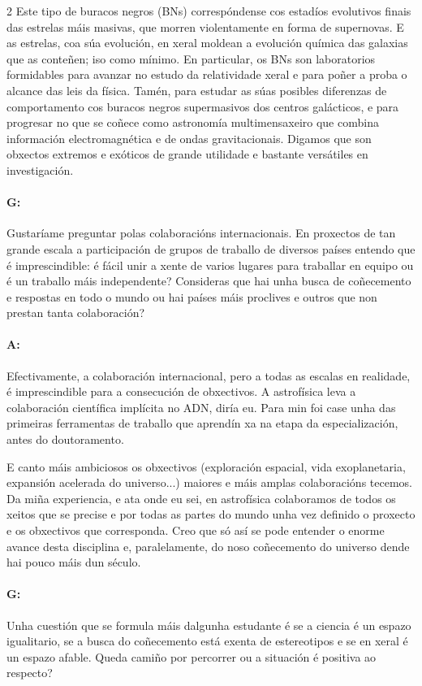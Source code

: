 \begin{multicols}{2}
Este tipo de buracos negros (BNs) correspóndense cos estadíos evolutivos finais
das estrelas máis masivas, que morren violentamente en forma de supernovas. E
as estrelas, coa súa evolución, en xeral moldean a evolución química das
galaxias que as conteñen; iso como mínimo. En particular, os BNs son
laboratorios formidables para avanzar no estudo da relatividade xeral e para
poñer a proba o alcance das leis da física. Tamén, para estudar as súas
posibles diferenzas de comportamento cos buracos negros supermasivos dos
centros galácticos, e para progresar no que se coñece como astronomía
multimensaxeiro que combina información electromagnética e de ondas
gravitacionais. Digamos que son obxectos extremos e exóticos de grande
utilidade e bastante versátiles en investigación.

\paragraph{G:} Gustaríame preguntar polas colaboracións internacionais. En
proxectos de tan grande escala a participación de grupos de traballo de
diversos países entendo que é imprescindible: é fácil unir a xente de varios
lugares para traballar en equipo ou é un traballo máis independente? Consideras
que hai unha busca de coñecemento e respostas en todo o mundo ou hai países
máis proclives e outros que non prestan tanta colaboración?

\paragraph{A:} Efectivamente, a colaboración internacional, pero a todas as
escalas en realidade, é imprescindible para a consecución de obxectivos. A
astrofísica leva a colaboración científica implícita no ADN, diría eu. Para min
foi case unha das primeiras ferramentas de traballo que aprendín xa na etapa da
especialización, antes do doutoramento.

E canto máis ambiciosos os obxectivos (exploración espacial, vida
exoplanetaria, expansión acelerada do universo...) maiores e máis amplas
colaboracións tecemos. Da miña experiencia, e ata onde eu sei, en
astrofísica colaboramos de todos os xeitos que se precise e por todas as partes
do mundo unha vez definido o proxecto e os obxectivos que corresponda. Creo
que só así se pode entender o enorme avance desta disciplina e, paralelamente,
do noso coñecemento do universo dende hai pouco máis dun século.

\paragraph{G:} Unha cuestión que se formula máis dalgunha estudante é se a
ciencia é un espazo igualitario, se a busca do coñecemento está exenta de
estereotipos e se en xeral é un espazo afable. Queda camiño por percorrer ou a
situación é positiva ao respecto?


\end{multicols}
